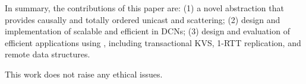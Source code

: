 In summary, the contributions of this paper are: (1) a novel abstraction \sys{} that provides causally and totally ordered unicast and scattering; (2) design and implementation of scalable and efficient \sys{} in DCNs; (3) design and evaluation of efficient applications using \sys{}, including transactional KVS, 1-RTT replication, and remote data structures.

This work does not raise any ethical issues.


